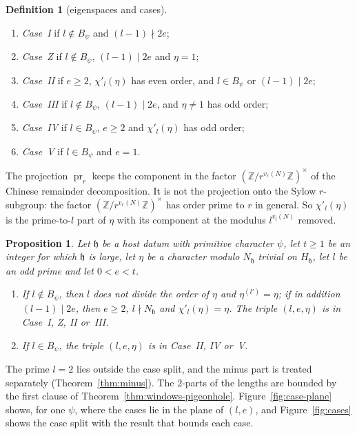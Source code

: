 \documentclass[11pt]{amsbook}
\theoremstyle{plain}
\newtheorem{proposition}[theorem]{Proposition}
\theoremstyle{definition}
\newtheorem{definition}[theorem]{Definition}
\theoremstyle{remark}
\numberwithin{equation}{section}
\numberwithin{figure}{chapter}
\numberwithin{table}{chapter}
\newcommand{\Z}{\mathbb{Z}}
\begin{document}
\begin{definition}[eigenspaces and cases]
\begin{enumerate}[label=(\arabic*)]
\begin{enumerate}[label=(\alph*)]
\item \emph{Case~I} if $l\notin B_\psi$ and $(l-1)\nmid2e$;
\item \emph{Case~Z} if $l\notin B_\psi$, $(l-1)\mid2e$ and $\eta=1$;
\item \emph{Case~II} if $e\ge2$, $\chi'_l(\eta)$ has even order, and
$l\in B_\psi$ or $(l-1)\mid2e$;
\item \emph{Case~III} if $l\notin B_\psi$, $(l-1)\mid2e$, and
$\eta\ne1$ has odd order;
\item \emph{Case~IV} if $l\in B_\psi$, $e\ge2$ and $\chi'_l(\eta)$ has
odd order;
\item \emph{Case~V} if $l\in B_\psi$ and $e=1$.
\end{enumerate}
\end{enumerate}
\end{definition}

\noindent The projection $\operatorname{pr}_r$ keeps the component in
the factor $(\Z/r^{v_r(N)}\Z)^\times$ of the Chinese remainder
decomposition. It is not the projection onto the Sylow $r$-subgroup:
the factor $(\Z/r^{v_r(N)}\Z)^\times$ has order prime to $r$ in
general. So $\chi'_l(\eta)$ is the prime-to-$l$ part of $\eta$ with its
component at the modulus $l^{v_l(N)}$ removed.

\begin{proposition}\label{prop:cases-exhaustive}
Let $\mathfrak h$ be a host datum with primitive character $\psi$, let $t\ge1$
be an integer for which $\mathfrak h$ is large, let $\eta$ be a character modulo
$N_{\mathfrak h}$ trivial on $H_{\mathfrak h}$, let $l$ be an odd prime and let
$0<e<t$.
\begin{enumerate}[label=(\alph*)]
\item\label{item:cases-good} If $l\notin B_\psi$, then $l$ does not
divide the order of $\eta$ and $\eta^{(l')}=\eta$; if in addition
$(l-1)\mid2e$, then $e\ge2$, $l\nmid N_{\mathfrak h}$ and $\chi'_l(\eta)=\eta$.
The triple $(l,e,\eta)$ is in Case~I, Z, II or~III.
\item\label{item:cases-bad} If $l\in B_\psi$, the triple $(l,e,\eta)$
is in Case~II, IV or~V.
\end{enumerate}
\end{proposition}

\noindent The prime $l=2$ lies outside the case split, and the minus
part is treated separately (Theorem~\ref{thm:minus}). The
$2$-parts of the lengths are bounded by the first clause of
Theorem~\ref{thm:windows-pigeonhole}. Figure~\ref{fig:case-plane} shows, for one $\psi$, where the cases lie in the plane of $(l,e)$, and Figure~\ref{fig:cases} shows the
case split with the result that bounds each case.
\begin{figure}[tbp]
\centering

\end{figure}
\end{document}
